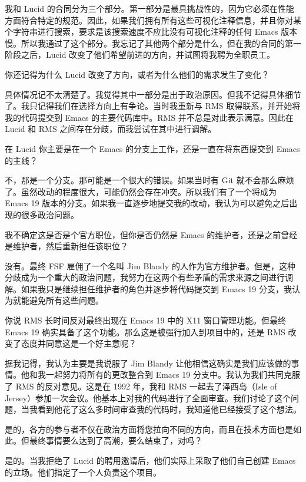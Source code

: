 \documentclass[format=acmsmall,screen]{acmart}
\begin{document}
我和 Lucid 的合同分为三个部分。第一部分是最具挑战性的，因为它必须在性能方面符合特定的规范。因此，如果我们拥有所有这些可视化注释信息，并且你对某个字符串进行搜索，要求是该搜索速度不应比没有可视化注释的任何 Emacs 版本慢。所以我通过了这个部分。我忘记了其他两个部分是什么，但在我的合同的第一阶段之后，Lucid 改变了他们希望前进的方向，并试图将我聘为全职员工。

\begin{question}
你还记得为什么 Lucid 改变了方向，或者为什么他们的需求发生了变化？
\end{question}
%
具体情况记不太清楚了。我觉得其中一部分是出于政治原因。但我不记得具体细节了。我只记得我们在选择方向上有争论。当时我重新与 RMS 取得联系，并开始将我的代码提交到 Emacs 的主要代码库中。RMS 并不总是对此表示满意。因此在 Lucid 和 RMS 之间存在分歧，而我尝试在其中进行调解。

\begin{question}
在 Lucid 你主要是在一个 Emacs 的分支上工作，还是一直在将东西提交到 Emacs 的主线？
\end{question}
%
不，那是一个分支。那可能是一个很大的错误。如果当时有 Git 就不会那么麻烦了。虽然改动的程度很大，可能仍然会存在冲突。所以我们有了一个将成为 Emacs 19 版本的分支。如果我一直逐步地提交我的改动，我认为可以避免之后出现的很多政治问题。

\begin{question}
我不确定这是否是个官方职位，但你是否仍然是 Emacs 的维护者，还是之前曾经是维护者，然后重新担任该职位？
\end{question}
%
没有。最终 FSF 雇佣了一个名叫 Jim Blandy 的人作为官方维护者。但是，这种分歧成为一个重大的政治问题，我努力在这两个有些矛盾的需求来源之间进行调解。如果我只是继续担任维护者的角色并逐步将代码提交到 Emacs 19 分支，我认为就能避免所有这些问题。

\begin{question}
你说 RMS 长时间反对最终出现在 Emacs 19 中的 X11 窗口管理功能。但最终 Emacs 19 确实具备了这个功能。那么这是被强行加入到项目中的，还是 RMS 改变了态度并同意这是一个好主意呢？
\end{question}
%
据我记得，我认为主要是我说服了 Jim Blandy 让他相信这确实是我们应该做的事情。他和我一起努力将所有的更改整合到 Emacs 19 分支中。我认为我们共同克服了 RMS 的反对意见。这是在 1992 年，我和 RMS 一起去了泽西岛（Isle of Jersey）参加一次会议。他基本上对我的代码进行了全面审查。我们讨论了这个问题，当我看到他花了这么多时间审查我的代码时，我知道他已经接受了这个想法。

\begin{question}
是的，各方的参与者不仅在政治方面将您拉向不同的方向，而且在技术方面也是如此。但最终事情要么达到了高潮，要么结束了，对吗？
\end{question}
%
是的。当我拒绝了 Lucid 的聘用邀请后，他们实际上采取了他们自己创建 Emacs 的立场。他们指定了一个人负责这个项目。
\end{document}
